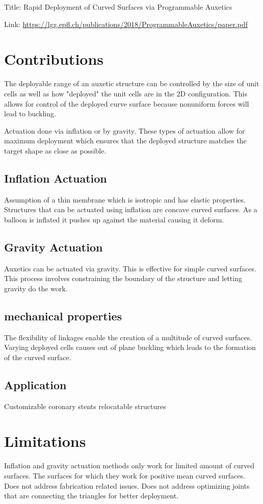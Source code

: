 \documentclass{article}
\begin{document}
    
Title: Rapid Deployment of Curved Surfaces via Programmable Auxetics

Link: \url{https://lgg.epfl.ch/publications/2018/ProgrammableAuxetics/paper.pdf} 

\section*{Contributions}
The deployable range of an auxetic structure can be controlled by the size of unit cells
as well as how "deployed" the unit cells are in the 2D configuration. This allows for 
control of the deployed curve surface because nonuniform forces will lead to buckling. 

Actuation done via inflation or by gravity. These types of actuation allow for maximum
deployment which ensures that the deployed structure matches the target shape as close 
as possible. 

\subsection*{Inflation Actuation}
Assumption of a thin membrane which is isotropic and has elastic properties. 
Structures that can be actuated using inflation are concave curved surfaces. As a balloon
is inflated it pushes up against the material causing it deform. 

\subsection*{Gravity Actuation}
Auxetics can be actuated via gravity. This is effective for simple curved surfaces. 
This process involves constraining the boundary of the structure and letting gravity do 
the work. 

\subsection*{mechanical properties}
The flexibility of linkages enable the creation of a multitude of curved surfaces. Varying
deployed cells causes out of plane buckling which leads to the formation of the curved
surface. 

\subsection*{Application}
Customizable coronary stents
relocatable structures

\section*{Limitations}
Inflation and gravity actuation methods only work for limited amount of curved surfaces. 
The surfaces for which they work for positive mean curved surfaces. Does not address 
fabrication related issues. Does not address optimizing joints that are connecting the 
triangles for better deployment. 
\end{document}
